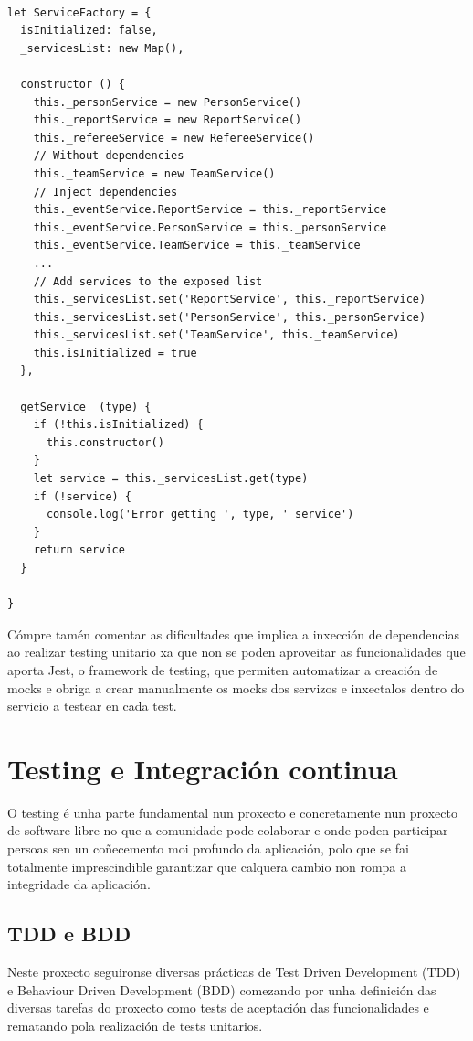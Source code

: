        \begin{lstlisting}[caption=Exemplo de internacionalización na label de 
un botón.]

let ServiceFactory = {
  isInitialized: false,
  _servicesList: new Map(),

  constructor () {
    this._personService = new PersonService()
    this._reportService = new ReportService()
    this._refereeService = new RefereeService()
    // Without dependencies
    this._teamService = new TeamService()
    // Inject dependencies
    this._eventService.ReportService = this._reportService
    this._eventService.PersonService = this._personService
    this._eventService.TeamService = this._teamService
    ...
    // Add services to the exposed list
    this._servicesList.set('ReportService', this._reportService)
    this._servicesList.set('PersonService', this._personService)
    this._servicesList.set('TeamService', this._teamService)
    this.isInitialized = true
  },

  getService  (type) {
    if (!this.isInitialized) {
      this.constructor()
    }
    let service = this._servicesList.get(type)
    if (!service) {
      console.log('Error getting ', type, ' service')
    }
    return service
  }

}
    \end{lstlisting}

  Cómpre tamén comentar as dificultades que implica a inxección de dependencias 
ao realizar testing unitario xa que non se poden aproveitar as funcionalidades 
que aporta Jest, o framework de testing, que permiten automatizar a creación de 
mocks e obriga a crear manualmente os mocks dos servizos e inxectalos dentro do 
servicio a testear en cada test.

  \section{Testing e Integración continua}
  O testing é unha parte fundamental nun proxecto e concretamente nun proxecto 
de software libre no que a comunidade pode colaborar e onde poden 
participar persoas sen un coñecemento moi profundo da aplicación, polo que se 
fai totalmente imprescindible garantizar que calquera cambio non rompa a 
integridade da aplicación.

    \subsection{TDD e BDD}
  Neste proxecto seguironse diversas prácticas de Test Driven Development 
(TDD) e Behaviour Driven Development (BDD) comezando por unha definición das 
diversas tarefas do proxecto como tests de aceptación das funcionalidades e 
rematando pola realización de tests unitarios.

